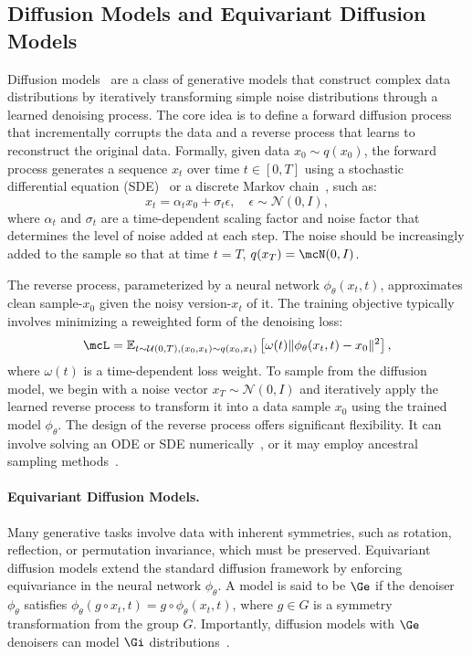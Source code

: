 
\subsection{Diffusion Models and Equivariant Diffusion Models}

Diffusion models~ are a class of generative models that construct complex data distributions by iteratively transforming simple noise distributions through a learned denoising process. The core idea is to define a forward diffusion process that incrementally corrupts the data and a reverse process that learns to reconstruct the original data. Formally, given data \( x_0 \sim q(x_0) \), the forward process generates a sequence \( x_t \) over time \( t \in [0, T] \) using a stochastic differential equation (SDE)~ or a discrete Markov chain~, such as:
\[
x_t = {\alpha_t} x_0 + \sigma_t \epsilon, \quad \epsilon \sim \mathcal{N}(0, I),
\]
where \( \alpha_t \) and \( \sigma_t \) are a time-dependent scaling factor and noise factor that determines the level of noise added at each step. The noise should be increasingly added to the sample so that at time $t = T$, $q(x_T) = \mcN(0, I)$.

The reverse process, parameterized by a neural network \( \phi_\theta(x_t, t) \), approximates clean sample-\( x_0 \) given the noisy version-\( x_t \) of it. The training objective typically involves minimizing a reweighted form of the denoising loss:
\begin{equation}
    \mcL = \mathbb{E}_{t \sim \mathcal{U}(0, T), (x_0, x_t) \sim q(x_0, x_t)} \left[ \omega(t) \| \phi_\theta (x_t, t) - x_0 \|^2 \right],
    \label{eqn:diff_loss}
\end{equation}
where \(\omega(t)\) is a time-dependent loss weight. To sample from the diffusion model, we begin with a noise vector \( x_T \sim \mathcal{N}(0, I) \) and iteratively apply the learned reverse process to transform it into a data sample \( x_0 \) using the trained model \( \phi_\theta \). The design of the reverse process offers significant flexibility. It can involve solving an ODE or SDE numerically~, or it may employ ancestral sampling methods~.


\paragraph{Equivariant Diffusion Models.}
Many generative tasks involve data with inherent symmetries, such as rotation, reflection, or permutation invariance, which must be preserved. Equivariant diffusion models extend the standard diffusion framework by enforcing equivariance in the neural network \( \phi_\theta \). A model is said to be \(\Ge\) if the denoiser \( \phi_\theta \) satisfies \( \phi_\theta (g \circ x_t , t) = g \circ \phi_\theta (x_t, t) \), where \( g \in G \) is a symmetry transformation from the group \( G \). Importantly, diffusion models with \( \Ge \) denoisers can model \( \Gi \) distributions~. 

